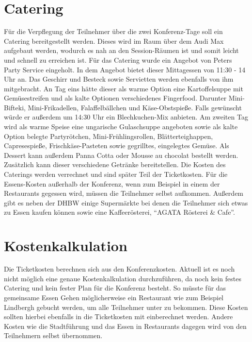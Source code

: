 \section{Catering}
Für die Verpflegung der Teilnehmer über die zwei Konferenz-Tage soll ein Catering bereitgestellt werden. Dieses wird im Raum über dem Audi Max aufgebaut werden, wodurch es nah an den Session-Räumen ist und somit leicht und schnell zu erreichen ist. Für das Catering wurde ein Angebot von Peters Party Service eingeholt. In dem Angebot bietet dieser Mittagessen von 11:30 - 14 Uhr an. Das Geschirr und Besteck sowie Servietten werden ebenfalls von ihm mitgebracht. An Tag eins hätte dieser als warme Option eine Kartoffelsuppe mit Gemüsestreifen und als kalte Optionen verschiedenes Fingerfood. Darunter Mini-Bifteki, Mini-Frikadellen, Falaffelbällchen und Käse-Obstspieße. Falls gewünscht würde er außerdem um 14:30 Uhr ein Blechkuchen-Mix anbieten. Am zweiten Tag wird als warme Speise eine ungarische Gulaschsuppe angeboten sowie als kalte Option belegte Partyrötchen, Mini-Frühlingsrollen, Blätterteighappen, Capresespieße, Frischkäse-Pasteten sowie gegrilltes, eingelegtes Gemüse. Als Dessert kann außerdem Panna Cotta oder Mousse au chocolat bestellt werden. Zusätzlich kann dieser verschiedene Getränke bereitstellen. Die Kosten des Caterings werden verrechnet und sind später Teil der Ticketkosten. Für die Essens-Kosten außerhalb der Konferenz, wenn zum Beispiel in einem der Restaurants gegessen wird, müssen die Teilnehmer selbst aufkommen.
Außerdem gibt es neben der DHBW einige Supermärkte bei denen die Teilnehmer sich etwas zu Essen kaufen können sowie eine Kaffeerösterei, \enquote{AGATA Rösterei \& Cafe}. 

\section{Kostenkalkulation}
Die Ticketkosten berechnen sich aus den Konferenzkosten. Aktuell ist es noch nicht möglich eine genaue Kostenkalkulation durchzuführen, da noch kein festes Catering und kein fester Plan für die Konferenz besteht. So müsste für das gemeinsame Essen Gehen möglicherweise ein Restaurant wie zum Beispiel Lindbergh gebucht werden, um alle Teilnehmer unter zu bekommen. Diese Kosten sollten hierbei ebenfalls in die Ticketkosten mit einberechnet werden. Andere Kosten wie die Stadtführung und das Essen in Restaurants dagegen wird von den Teilnehmern selbst übernommen. 

